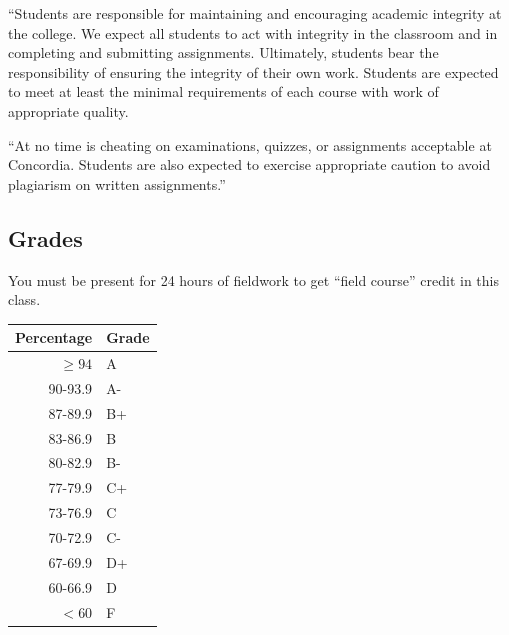 \documentclass{tufte-handout}
\begin{document}
``Students are responsible for maintaining and encouraging academic integrity at the college. We expect all students to act with integrity in the classroom and in completing and submitting assignments. Ultimately, students bear the responsibility of ensuring the integrity of their own work. Students are expected to meet at least the minimal requirements of each course with work of appropriate quality. 


``At no time is cheating on examinations, quizzes, or assignments acceptable at Concordia. Students are also expected to exercise appropriate caution to avoid plagiarism on written assignments.''

\newpage


\subsection{Grades}

You must be present for 24 hours of fieldwork to get ``field course'' credit in this class.


\begin{margintable}
\begin{tabular}{rl}
Percentage & Grade \\
\hline 
$\ge94$ & A \\
90-93.9 & A- \\
87-89.9 & B+ \\
83-86.9 & B \\
80-82.9 & B- \\
77-79.9 & C+ \\
73-76.9 & C \\
70-72.9 & C- \\
67-69.9 & D+ \\
60-66.9 & D \\
$<60$ & F \\
\hline
\end{tabular}
\end{margintable}
\end{document}
